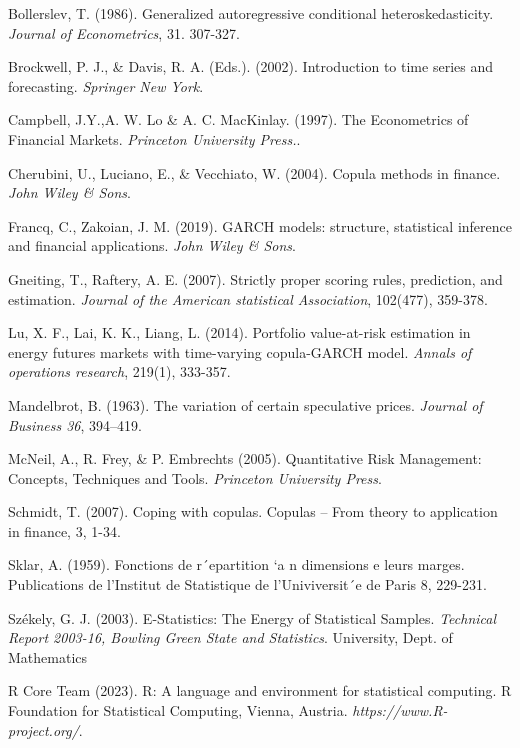 \documentclass[12pt,a4paper]{article}
\numberwithin{equation}{section}
\begin{document}
\newpage
\begin{thebibliography}{11}
\bibitem{}
Bollerslev, T. (1986). Generalized autoregressive conditional heteroskedasticity.  \emph{Journal of Econometrics}, 31. 307-327.

\bibitem{}
Brockwell, P. J., \& Davis, R. A. (Eds.). (2002). Introduction to time series and forecasting.  \emph{Springer New York}.


\bibitem{}
Campbell, J.Y.,A. W. Lo \& A. C. MacKinlay. (1997). The Econometrics of Financial Markets. \emph{Princeton University Press.}.

\bibitem{}
Cherubini, U., Luciano, E., \& Vecchiato, W. (2004). Copula methods in finance. \emph{John Wiley \& Sons}.


\bibitem{}
Francq, C., Zakoian, J. M. (2019). GARCH models: structure, statistical inference and financial applications. \emph{ John Wiley \& Sons}.


\bibitem{}
Gneiting, T., Raftery, A. E. (2007). Strictly proper scoring rules, prediction, and estimation. \emph{Journal of the American statistical Association}, 102(477), 359-378.

\bibitem{}
Lu, X. F., Lai, K. K., Liang, L. (2014). Portfolio value-at-risk estimation in energy futures markets with time-varying copula-GARCH model. \emph{Annals of operations research}, 219(1), 333-357.

\bibitem{}
Mandelbrot, B. (1963). The variation of certain speculative prices.  \emph{Journal of Business 36}, 394–419.

\bibitem{}
McNeil, A., R. Frey, \& P. Embrechts (2005). Quantitative Risk Management: Concepts, Techniques and Tools. \emph{Princeton University Press}.

\bibitem{}
Schmidt, T. (2007). Coping with copulas. Copulas – From theory to application in finance, 3, 1-34.

\bibitem{}
Sklar, A. (1959). Fonctions de r´epartition `a n dimensions e leurs marges. Publications de l’Institut de Statistique de l’Univiversit´e de Paris 8, 229-231.

\bibitem{}
Székely, G. J. (2003). E-Statistics: The Energy of Statistical Samples. \emph{Technical Report 2003-16, Bowling Green State and Statistics}. University, Dept. of Mathematics

\bibitem{}
R Core Team (2023). R: A language and environment for statistical computing. R Foundation for Statistical Computing, Vienna, Austria. \emph{https://www.R-project.org/}.



\end{thebibliography}
\end{document}
